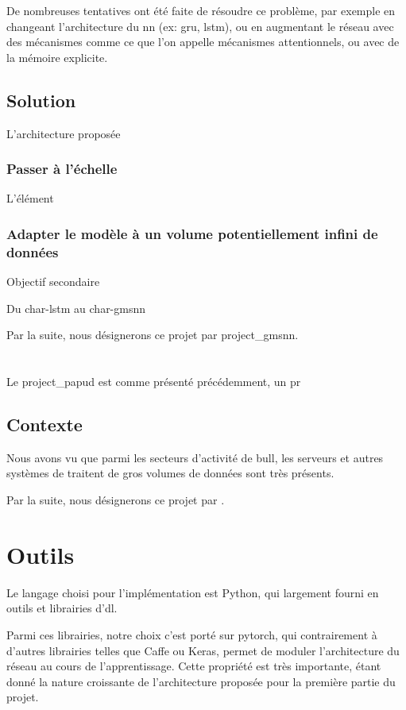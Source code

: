 De nombreuses tentatives ont été faite de résoudre ce problème, par exemple en changeant l'architecture du \gls{nn} (ex: \gls{gru}, \gls{lstm}), ou en augmentant le réseau avec des mécanismes comme ce que l'on appelle mécanismes attentionnels, ou avec de la mémoire explicite.

\subsection*{Solution}
L'architecture proposée 

\subsubsection*{Passer à l'échelle}
L'élément 

\subsubsection*{Adapter le modèle à un volume potentiellement infini de données}
Objectif secondaire

\subsubsectionbreak

Du char-lstm au char-gmsnn




Par la suite, nous désignerons ce projet par \og \gls{project_gmsnn}\fg{}.


\clearpage
\section{\label{sec:projet:papud}}
Le \gls{project_papud} est comme présenté précédemment, un pr

\subsection*{Contexte}
Nous avons vu que parmi les secteurs d'activité de \gls{bull}, les serveurs et autres systèmes de traitent de gros volumes de données sont très présents.


Par la suite, nous désignerons ce projet par \og {}\fg{}.


\section{Outils}
Le langage choisi pour l'implémentation est Python, qui largement fourni en outils et librairies d'\gls{dl}.

Parmi ces librairies, notre choix c'est porté sur \gls{pytorch}, qui contrairement à d'autres librairies telles que Caffe ou Keras, permet de moduler l'architecture du réseau au cours de l'apprentissage. Cette propriété est très importante, étant donné la nature \og croissante\fg{} de l'architecture proposée pour la première partie du projet.


